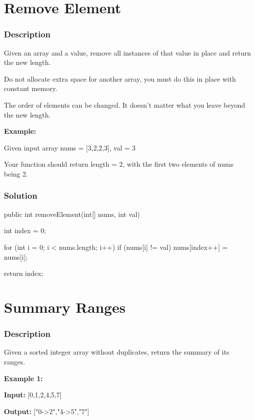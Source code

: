 \newpage

\section{Remove Element} %

\subsubsection{Description}
Given an array and a value, remove all instances of that value in place and return the new length.

Do not allocate extra space for another array, you must do this in place with constant memory.

The order of elements can be changed. It doesn't matter what you leave beyond the new length.

\textbf{Example:}

Given input array nums = [3,2,2,3], val = 3

Your function should return length = 2, with the first two elements of nums being 2.

\subsubsection{Solution}

\begin{Code}
public int removeElement(int[] nums, int val) {
    int index = 0;

    for (int i = 0; i < nums.length; i++) {
        if (nums[i] != val) {
            nums[index++] = nums[i];
        }
    }

    return index;
}
\end{Code}

\newpage

\section{Summary Ranges} %

\subsubsection{Description}
Given a sorted integer array without duplicates, return the summary of its ranges.

\textbf{Example 1:}

\textbf{Input:} [0,1,2,4,5,7]

\textbf{Output:} ["0->2","4->5","7"]

